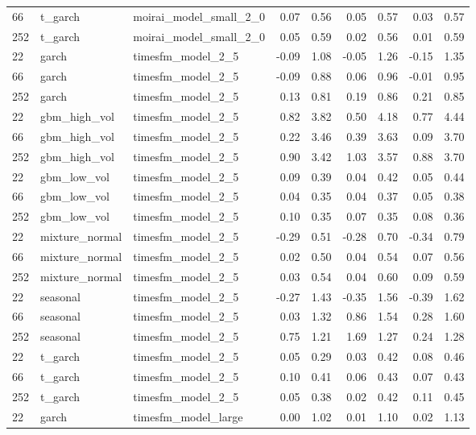 {\begin{tabular}{lllrrrrrr}
66 & t\_garch & moirai\_model\_small\_2\_0 & 0.07 & 0.56 & 0.05 & 0.57 & 0.03 & 0.57 \\
252 & t\_garch & moirai\_model\_small\_2\_0 & 0.05 & 0.59 & 0.02 & 0.56 & 0.01 & 0.59 \\
\midrule
22 & garch & timesfm\_model\_2\_5 & -0.09 & 1.08 & -0.05 & 1.26 & -0.15 & 1.35 \\
66 & garch & timesfm\_model\_2\_5 & -0.09 & 0.88 & 0.06 & 0.96 & -0.01 & 0.95 \\
252 & garch & timesfm\_model\_2\_5 & 0.13 & 0.81 & 0.19 & 0.86 & 0.21 & 0.85 \\
\midrule
22 & gbm\_high\_vol & timesfm\_model\_2\_5 & 0.82 & 3.82 & 0.50 & 4.18 & 0.77 & 4.44 \\
66 & gbm\_high\_vol & timesfm\_model\_2\_5 & 0.22 & 3.46 & 0.39 & 3.63 & 0.09 & 3.70 \\
252 & gbm\_high\_vol & timesfm\_model\_2\_5 & 0.90 & 3.42 & 1.03 & 3.57 & 0.88 & 3.70 \\
\midrule
22 & gbm\_low\_vol & timesfm\_model\_2\_5 & 0.09 & 0.39 & 0.04 & 0.42 & 0.05 & 0.44 \\
66 & gbm\_low\_vol & timesfm\_model\_2\_5 & 0.04 & 0.35 & 0.04 & 0.37 & 0.05 & 0.38 \\
252 & gbm\_low\_vol & timesfm\_model\_2\_5 & 0.10 & 0.35 & 0.07 & 0.35 & 0.08 & 0.36 \\
\midrule
22 & mixture\_normal & timesfm\_model\_2\_5 & -0.29 & 0.51 & -0.28 & 0.70 & -0.34 & 0.79 \\
66 & mixture\_normal & timesfm\_model\_2\_5 & 0.02 & 0.50 & 0.04 & 0.54 & 0.07 & 0.56 \\
252 & mixture\_normal & timesfm\_model\_2\_5 & 0.03 & 0.54 & 0.04 & 0.60 & 0.09 & 0.59 \\
\midrule
22 & seasonal & timesfm\_model\_2\_5 & -0.27 & 1.43 & -0.35 & 1.56 & -0.39 & 1.62 \\
66 & seasonal & timesfm\_model\_2\_5 & 0.03 & 1.32 & 0.86 & 1.54 & 0.28 & 1.60 \\
252 & seasonal & timesfm\_model\_2\_5 & 0.75 & 1.21 & 1.69 & 1.27 & 0.24 & 1.28 \\
\midrule
22 & t\_garch & timesfm\_model\_2\_5 & 0.05 & 0.29 & 0.03 & 0.42 & 0.08 & 0.46 \\
66 & t\_garch & timesfm\_model\_2\_5 & 0.10 & 0.41 & 0.06 & 0.43 & 0.07 & 0.43 \\
252 & t\_garch & timesfm\_model\_2\_5 & 0.05 & 0.38 & 0.02 & 0.42 & 0.11 & 0.45 \\
\midrule
22 & garch & timesfm\_model\_large & 0.00 & 1.02 & 0.01 & 1.10 & 0.02 & 1.13 \\

\end{tabular}}
